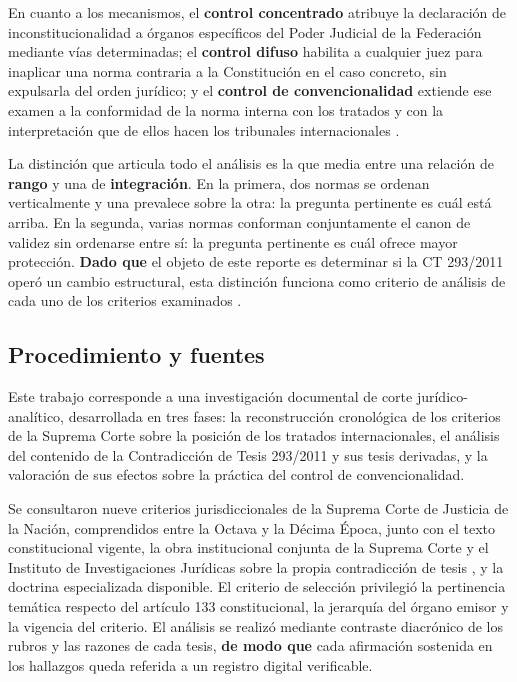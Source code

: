 \documentclass[
  spanish,
  letterpaper, oneside
]{article}
\begin{document}
En cuanto a los mecanismos, el \textbf{control concentrado} atribuye la declaración de inconstitucionalidad a órganos específicos del Poder Judicial de la Federación mediante vías determinadas; el \textbf{control difuso} habilita a cualquier juez para inaplicar una norma contraria a la Constitución en el caso concreto, sin expulsarla del orden jurídico; y el \textbf{control de convencionalidad} extiende ese examen a la conformidad de la norma interna con los tratados y con la interpretación que de ellos hacen los tribunales internacionales \citep{marcanoSalazarDerechosHumanos}.

La distinción que articula todo el análisis es la que media entre una relación de \textbf{rango} y una de \textbf{integración}. En la primera, dos normas se ordenan verticalmente y una prevalece sobre la otra: la pregunta pertinente es cuál está arriba. En la segunda, varias normas conforman conjuntamente el canon de validez sin ordenarse entre sí: la pregunta pertinente es cuál ofrece mayor protección. \textbf{Dado que} el objeto de este reporte es determinar si la CT 293/2011 operó un cambio estructural, esta distinción funciona como criterio de análisis de cada uno de los criterios examinados \citep{rabinovichBerkmanDerechosHumanos}.

\subsection{Procedimiento y fuentes}

Este trabajo corresponde a una investigación documental de corte jurídico-analítico, desarrollada en tres fases: la reconstrucción cronológica de los criterios de la Suprema Corte sobre la posición de los tratados internacionales, el análisis del contenido de la Contradicción de Tesis 293/2011 y sus tesis derivadas, y la valoración de sus efectos sobre la práctica del control de convencionalidad.

Se consultaron nueve criterios jurisdiccionales de la Suprema Corte de Justicia de la Nación, comprendidos entre la Octava y la Décima Época, junto con el texto constitucional vigente, la obra institucional conjunta de la Suprema Corte y el Instituto de Investigaciones Jurídicas sobre la propia contradicción de tesis \citep{scjnIijCT293y2017}, y la doctrina especializada disponible. El criterio de selección privilegió la pertinencia temática respecto del artículo 133 constitucional, la jerarquía del órgano emisor y la vigencia del criterio. El análisis se realizó mediante contraste diacrónico de los rubros y las razones de cada tesis, \textbf{de modo que} cada afirmación sostenida en los hallazgos queda referida a un registro digital verificable.
\end{document}
